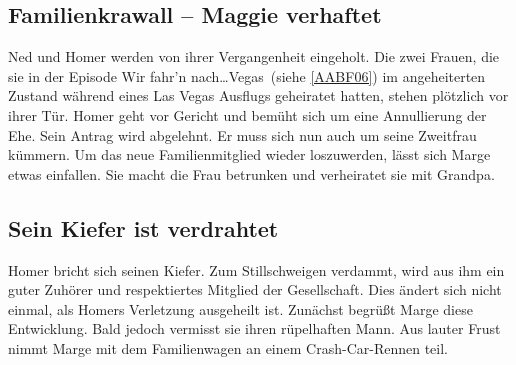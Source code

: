\subsection{Familienkrawall -- Maggie verhaftet}
Ned und Homer werden von ihrer Vergangenheit eingeholt. Die zwei Frauen, die sie in der Episode \glqq Wir fahr'n nach\dots Vegas\grqq\ (siehe \ref{AABF06}) im angeheiterten Zustand während eines Las Vegas Ausflugs geheiratet hatten, stehen plötzlich vor ihrer Tür. Homer geht vor Gericht und bemüht sich um eine Annullierung der Ehe. Sein Antrag wird abgelehnt. Er muss sich nun auch um seine Zweitfrau kümmern. Um das neue Familienmitglied wieder loszuwerden, lässt sich Marge etwas einfallen. Sie macht die Frau betrunken und verheiratet sie mit Grandpa.


\subsection{Sein Kiefer ist verdrahtet}
Homer bricht sich seinen Kiefer. Zum Stillschweigen verdammt, wird aus ihm ein guter Zuhörer und respektiertes Mitglied der Gesellschaft. Dies ändert sich nicht einmal, als Homers Verletzung ausgeheilt ist. Zunächst begrüßt Marge diese Entwicklung. Bald jedoch vermisst sie ihren rüpelhaften Mann. Aus lauter Frust nimmt Marge mit dem Familienwagen an einem Crash-Car-Rennen teil.


